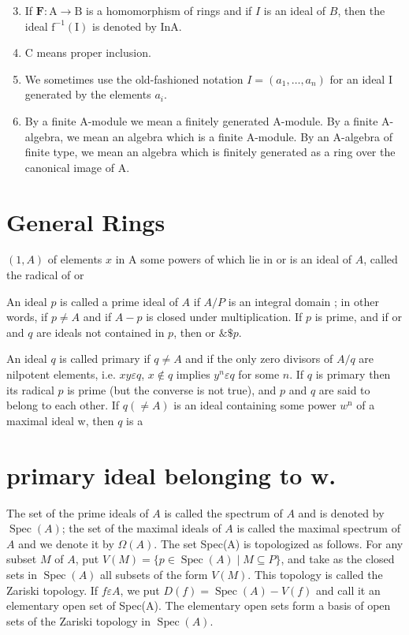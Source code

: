\begin{enumerate}
  \setcounter{enumi}{2}
  \item If $\mathbf{F}: \mathrm{A} \rightarrow \mathrm{B}$ is a homomorphism of rings and if $I$ is an ideal of $B$, then the ideal $\mathrm{f}^{-1}(\mathrm{I})$ is denoted by InA.

  \item C means proper inclusion.

  \item We sometimes use the old-fashioned notation $I=\left(a_{1}, \ldots, a_{n}\right)$ for an ideal I generated by the elements $a_{i}$.

  \item By a finite A-module we mean a finitely generated A-module. By a finite A-algebra, we mean an algebra which is a finite A-module. By an A-algebra of finite type, we mean an algebra which is finitely generated as a ring over the canonical image of $\mathrm{A}$.

\end{enumerate}
\section{General Rings}
$(1, A)$ of elements $x$ in A some powers of which lie in or is an ideal of $A$, called the radical of or

An ideal $p$ is called a prime ideal of $A$ if $A / P$ is an integral domain ; in other words, if $p \neq A$ and if $A-p$ is closed under multiplication. If $p$ is prime, and if or and $q$ are ideals not contained in $p$, then or $\& \$ p$.

An ideal $q$ is called primary if $q \neq A$ and if the only zero divisors of $A / q$ are nilpotent elements, i.e. $x y \varepsilon q$, $x \notin q$ implies $y^{n} \varepsilon q$ for some $n$. If $q$ is primary then its radical $p$ is prime (but the converse is not true), and $p$ and $q$ are said to belong to each other. If $q(\neq A)$ is an ideal containing some power $w^{\mathrm{n}}$ of a maximal ideal w, then $q$ is a

\section{primary ideal belonging to w.}
The set of the prime ideals of $A$ is called the spectrum of $A$ and is denoted by $\operatorname{Spec}(A)$; the set of the maximal ideals of $A$ is called the maximal spectrum of $A$ and we denote it by $\Omega(A)$. The set Spec(A) is topologized as follows. For any subset $M$ of $A$, put $V(M)=\{p \in \operatorname{Spec}(A) \mid M \subseteq P\}$, and take as the closed sets in $\operatorname{Spec}(A)$ all subsets of the form $V(M)$. This topology is called the Zariski topology. If $f \varepsilon A$, we put $D(f)=\operatorname{Spec}(A)-V(f)$ and call it an elementary open set of Spec(A). The elementary open sets form a basis of open sets of the Zariski topology in $\operatorname{Spec}(A) .$

